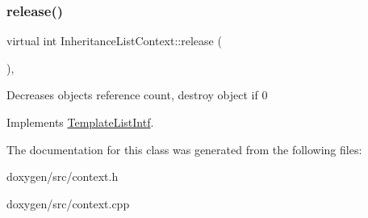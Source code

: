 \mbox{\label{class_inheritance_list_context_a1ab111b2d69cdf8920529f5674dba6d9}} 
\subsubsection{\texorpdfstring{release()}{release()}}
{\footnotesize\ttfamily virtual int Inheritance\+List\+Context\+::release (\begin{DoxyParamCaption}{ }\end{DoxyParamCaption})\hspace{0.3cm}{\ttfamily [inline]}, {\ttfamily [virtual]}}

Decreases object\textquotesingle{}s reference count, destroy object if 0 

Implements \mbox{\hyperlink{class_template_list_intf_a0c53169c740c09dac47efc62bbe39674}{Template\+List\+Intf}}.



The documentation for this class was generated from the following files\+:\begin{DoxyCompactItemize}
\item 
doxygen/src/context.\+h\item 
doxygen/src/context.\+cpp\end{DoxyCompactItemize}
